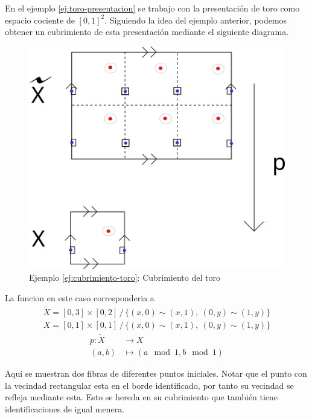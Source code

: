 \begin{ejemplo} \label{ej:cubrimiento-toro}
  En el ejemplo \ref{ej:toro-presentacion} se trabajo con la
  presentación de toro como espacio cociente de \([0,1]^2\). Siguiendo
  la idea del ejemplo anterior, podemos obtener un cubrimiento de esta
  presentación mediante el siguiente diagrama.
  \begin{figure}[h]
    \centering \includegraphics[scale=0.5]{./imagenes/toro-cubrimiento.png}
    \caption*{Ejemplo \ref{ej:cubrimiento-toro}: Cubrimiento del toro}
  \end{figure}
  La funcion en este caso corresponderia a
  \begin{gather*}
    \tilde X = [0,3] \times [0,2] \, / \, \{
      (x,0) \sim (x, 1), \ (0,y) \sim (1,y) \} \\
    X = [0,1] \times [0,1] \, / \, \{
      (x,0) \sim (x, 1), \ (0,y) \sim (1,y) \}
  \end{gather*}
  \begin{align*}
    p : \tilde X &\longrightarrow X \\
    (a,b) &\longmapsto \left( a \mod {1}, b \mod {1} \right)
  \end{align*}

  Aquí se muestran dos fibras de diferentes puntos iniciales. Notar que
  el punto con la vecindad rectangular esta en el borde identificado,
  por tanto su vecindad se refleja mediante esta. Esto se hereda en su
  cubrimiento que también tiene identificaciones de igual menera.
\end{ejemplo}


